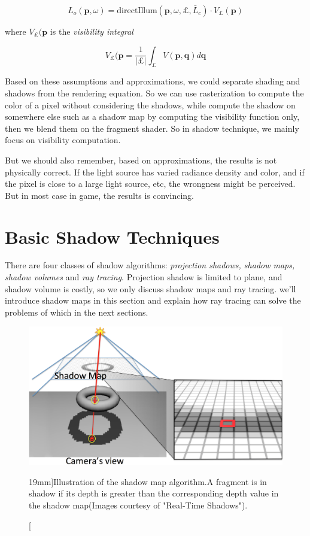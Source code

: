 \begin{equation}
	L_{o}(\mathbf{p},\omega)=\text{directIllum}(\mathbf{p},\omega,\pounds,\bar{L}_{c})\cdot V_{\pounds}(\mathbf{p})
\end{equation}

where $V_{\pounds}(\mathbf{p}$ is the \textit{visibility integral}

\begin{equation}
	V_{\pounds}(\mathbf{p}=\frac{1}{|\pounds|}\int_{\pounds}V(\mathbf{p},\mathbf{q})d\mathbf{q}
\end{equation}  

Based on these assumptions and approximations, we could separate shading and shadows from the rendering equation. So we can use rasterization to compute the color of a pixel without considering the shadows, while compute the shadow on somewhere else such as a shadow map by computing the visibility function only, then we blend them on the fragment shader. So in shadow technique, we mainly focus on visibility computation. 

But we should also remember, based on approximations, the results is not physically correct. If the light source has varied radiance density and color, and if the pixel is close to a large light source, etc, the wrongness might be perceived. But in most case in game, the results is convincing. 

\section{Basic Shadow Techniques}
There are four classes of shadow algorithms: \textit{projection shadows, shadow maps, shadow volumes} and \textit{ray tracing}. Projection shadow is limited to plane, and shadow volume is costly, so we only discuss shadow maps and ray tracing. we'll introduce shadow maps in this section and explain how ray tracing can solve the problems of which in the next sections.

\begin{figure}\label{f:shadow-maps}
	\includegraphics[width=1.0\textwidth]{graphics/shadows/shadow-map}
	\caption[][19mm]{Illustration of the shadow map algorithm.A fragment is in shadow if its depth is greater than the corresponding depth value in the shadow map(Images courtesy of "Real-Time Shadows").}
\end{figure}

